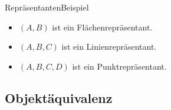 \documentclass[10pt,xcolor={dvipsnames}]{beamer}
\begin{document}
\begin{frame}{Repräsentanten}{Beispiel}
    \begin{itemize}
        \item $(A,B)$ ist ein Flächenrepräsentant.
        \item $(A,B,C)$ ist ein Linienrepräsentant.
        \item $(A,B,C,D)$ ist ein Punktrepräsentant.
    \end{itemize}
\end{frame}


\subsection{Objektäquivalenz}

\end{document}
